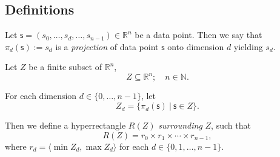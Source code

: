 


\subsection{Definitions}
\begin{definition}
Let $\mathsf{s}=(s_0, \dots, s_d, \dots, s_{n-1})\in \mathbb{R}^n$ be a data point. Then we say that $\pi_d(\mathsf{s}):=s_d$ is a \emph{projection} of data point $\mathsf{s}$ onto  dimension $d$  yielding $s_d$.
\end{definition}

\begin{definition}
Let $Z$ be a finite subset of $\mathbb{R}^n$,
$$Z \subseteq \mathbb{R}^n ;\quad n \in \mathbb{N}.$$

For each dimension \(d \in\{0, \dots, n - 1\}\), let
$$Z_d = \{ \pi_d(\mathsf{s})\ |\ \mathsf{s} \in Z \}.$$

Then we define a hyperrectangle $R(Z)$ \emph{surrounding} $Z$, such that
$$R(Z) = r_0 \times r_1 \times \cdots \times r_{n-1},$$ where $r_d = \langle \min Z_d, \max Z_d \rangle$ for each $d \in \{0,1, \dots, n-1\}.$

\end{definition}


